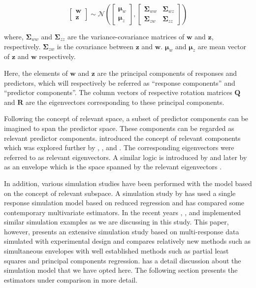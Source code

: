 \documentclass[12pt,3p,authoryear]{elsarticle}
\begin{document}
\begin{equation}
  \begin{bmatrix}
    \mathbf{w} \\ \mathbf{z}
  \end{bmatrix} \sim \mathcal{N}
  \left(
    \begin{bmatrix}
      \boldsymbol{\mu}_w \\
      \boldsymbol{\mu}_z
    \end{bmatrix},
    \begin{bmatrix}
    \boldsymbol{\Sigma}_{ww} & \boldsymbol{\Sigma}_{wz} \\
    \boldsymbol{\Sigma}_{zw} & \boldsymbol{\Sigma}_{zz}
    \end{bmatrix}
  \right)
  \label{eq:model-2}
\end{equation}

where, \(\boldsymbol{\Sigma}_{ww}\) and \(\boldsymbol{\Sigma}_{zz}\) are
the variance-covariance matrices of \(\mathbf{w}\) and \(\mathbf{z}\),
respectively. \(\boldsymbol{\Sigma}_{zw}\) is the covariance between
\(\mathbf{z}\) and \(\mathbf{w}\). \(\boldsymbol{\mu}_w\) and
\(\boldsymbol{\mu}_z\) are mean vector of \(\mathbf{z}\) and
\(\mathbf{w}\) respectively.

Here, the elements of \(\mathbf{w}\) and \(\mathbf{z}\) are the
principal components of responses and predictors, which will
respectively be referred as ``response components'' and ``predictor
components''. The column vectors of respective rotation matrices
\(\mathbf{Q}\) and \(\mathbf{R}\) are the eigenvectors corresponding to
these principal components.

Following the concept of relevant space, a subset of predictor
components can be imagined to span the predictor space. These components
can be regarded as relevant predictor components. \citet{Naes1985}
introduced the concept of relevant components which was explored further
by \citet{helland1990partial}, \citet{naes1993relevant},
\citet{Helland1994b} and \citet{Helland2000}. The corresponding
eigenvectors were referred to as relevant eigenvectors. A similar logic
is introduced by \citet{cook2010envelope} and later by
\citet{cook2013envelopes} as an envelope which is the space spanned by
the relevant eigenvectors \citep[pp.~101]{cook2018envelope}.

In addition, various simulation studies have been performed with the
model based on the concept of relevant subspace. A simulation study by
\citet{Alm_y_1996} has used a single response simulation model based on
reduced regression and has compared some contemporary multivariate
estimators. In the recent years \citet{helland2012near},
\citet{saebo2015simrel}, \citet{helland2016algorithms} and
\citet{Rimal2018} implemented similar simulation examples as we are
discussing in this study. This paper, however, presents an extensive
simulation study based on multi-response data simulated with
experimental design and compares relatively new methods such as
simultaneous envelopes with well established methods such as partial
least squares and principal components regression. \citet{Rimal2018} has
a detail discussion about the simulation model that we have opted here.
The following section presents the estimators under comparison in more
detail.
\end{document}
